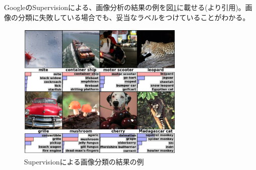 GoogleのSupervisionによる、画像分析の結果の例を図\ref{c3_supervision}に載せる(\cite{krizhevsky2012imagenet}より引用)。画像の分類に失敗している場合でも、妥当なラベルをつけていることがわかる。\begin{figure}[tbp]
 \begin{center}
  \includegraphics[width=80mm]{img/c3/supervision}
 \end{center}
 \caption{Supervisionによる画像分類の結果の例}
 \label{c3_supervision}
\end{figure}

